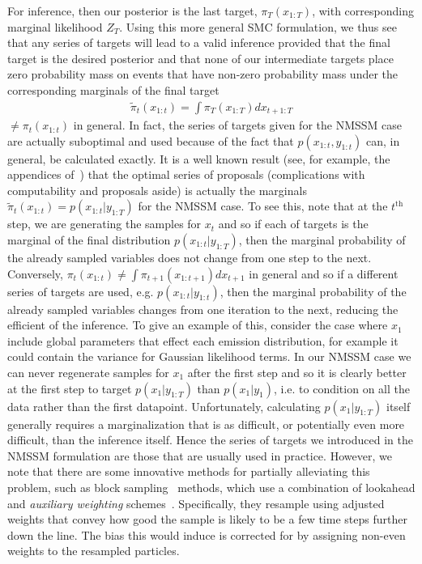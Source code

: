 For inference, then our posterior is the
last target, $\pi_T (x_{1:T})$, with corresponding marginal likelihood $Z_T$.  Using this
more general SMC formulation, we thus see that any series of targets will lead
to a valid inference provided that the final target is the desired posterior and that none
of our intermediate targets place zero probability mass on events that have non-zero
probability mass under the corresponding marginals of the final target 
\begin{align}
\label{eq:part:opt-target}
\tilde{\pi}_t (x_{1:t}) = \int \pi_T (x_{1:T}) dx_{t+1:T}
\end{align}
$\ne \pi_t (x_{1:t})$ in general.  In fact, the series of targets given
for the NMSSM case are actually suboptimal and used because of the fact that
$p(x_{1:t},y_{1:t})$ can, in general, be calculated exactly.  It is a well known result
(see, for example, the appendices of~\cite{le2017auto}) that the optimal series
of proposals (complications with computability and proposals aside) is actually 
the marginals $\tilde{\pi}_t (x_{1:t})=p(x_{1:t} | y_{1:T})$ for
the NMSSM case.  To see this, note that at the $t^{\mathrm{th}}$ step, we are generating 
the samples for $x_{t}$ and so if each of targets is the marginal of the final distribution
$p(x_{1:t} | y_{1:T})$, then the marginal probability of the already sampled variables does not change from
one step to the next.  Conversely, $\pi_t (x_{1:t}) \neq \int \pi_{t+1} (x_{1:t+1}) dx_{t+1}$
in general and so if a different series of targets are used,
e.g. $p(x_{1:t}|y_{1:t})$, then the marginal probability of the already sampled
variables changes from one iteration to the next, reducing the efficient of the inference.
To give an example of this, consider
the case where $x_{1}$ include global parameters that effect each emission
distribution, for example it could contain the variance for Gaussian
likelihood terms.  In our NMSSM case we can never regenerate samples for $x_1$ after
the first step and so it is clearly better at the first step to target $p(x_1 | y_{1:T})$ than $p(x_1|y_1)$,
i.e. to condition on all the data rather than the first datapoint. Unfortunately, calculating
$p(x_1 | y_{1:T})$ itself generally requires a marginalization that is as difficult, or potentially
even more difficult, than the inference itself.  Hence the series of targets we introduced in
the NMSSM formulation are those that are usually used in practice.  However, we note that there are some
innovative methods for partially alleviating this problem, such as block sampling~\citep{doucet2006efficient} methods,
which use a combination of lookahead and \emph{auxiliary weighting} schemes~\citep{cappe2007overview}.
Specifically, they resample using adjusted weights that convey how good the sample is likely
to be a few time steps further down the line.  The bias this would induce is corrected for
by assigning non-even weights to the resampled particles.

